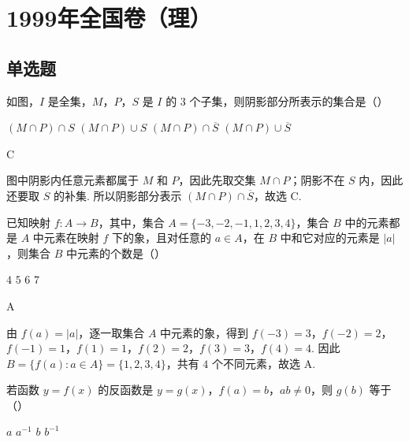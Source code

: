 \documentclass[UTF8,a4paper,oneside,11pt]{ctexbook}
\begin{document}
\mainmatter

\chapter{1999年全国卷（理）}
\section{单选题}

\begin{problem}
如图，\(I\) 是全集，\(M\)，\(P\)，\(S\) 是 \(I\) 的 \(3\) 个子集，则阴影部分所表示的集合是（\quad）


\choices
    {\((M\cap P)\cap S\)}
    {\((M\cap P)\cup S\)}
    {\((M\cap P)\cap \overline{S}\)}
    {\((M\cap P)\cup \overline{S}\)}
\end{problem}

\begin{answer}
C
\end{answer}

\begin{solution}
图中阴影内任意元素都属于 \(M\) 和 \(P\)，因此先取交集 \(M\cap P\)；阴影不在 \(S\) 内，因此还要取 \(S\) 的补集. 所以阴影部分表示
\((M\cap P)\cap\overline{S}\)，故选 C.
\end{solution}

\begin{problem}
已知映射 \(f:A\to B\)，其中，集合 \(A=\{-3,-2,-1,1,2,3,4\}\)，集合 \(B\) 中的元素都是 \(A\) 中元素在映射 \(f\) 下的象，且对任意的 \(a\in A\)，在 \(B\) 中和它对应的元素是 \(|a|\)，则集合 \(B\) 中元素的个数是（\quad）

\choices
    {\(4\)}
    {\(5\)}
    {\(6\)}
    {\(7\)}
\end{problem}

\begin{answer}
A
\end{answer}

\begin{solution}
由 \(f(a)=|a|\)，逐一取集合 \(A\) 中元素的象，得到
\(f(-3)=3\)，\(f(-2)=2\)，\(f(-1)=1\)，\(f(1)=1\)，\(f(2)=2\)，\(f(3)=3\)，\(f(4)=4\).
因此
\(B=\{f(a):a\in A\}=\{1,2,3,4\}\)，共有 \(4\) 个不同元素，故选 A.
\end{solution}

\begin{problem}
若函数 \(y=f(x)\) 的反函数是 \(y=g(x)\)，\(f(a)=b\)，\(ab\neq 0\)，则 \(g(b)\) 等于（\quad）

\choices
    {\(a\)}
    {\(a^{-1}\)}
    {\(b\)}
    {\(b^{-1}\)}
\end{problem}
\end{document}
